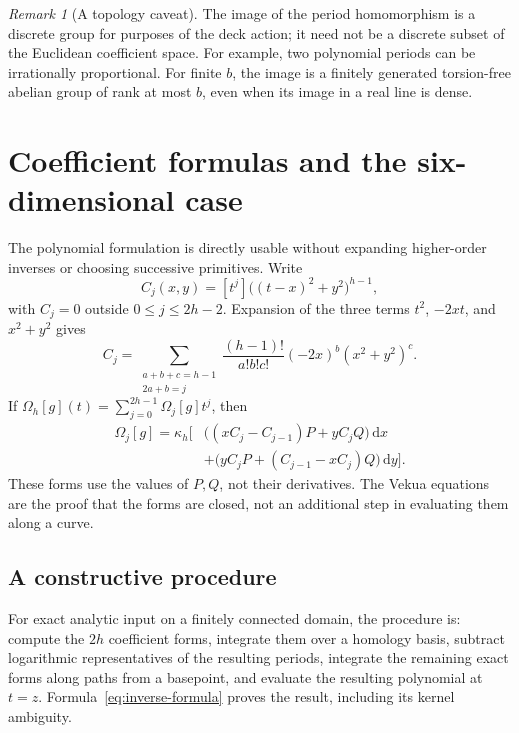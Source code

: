 \documentclass[11pt,a4paper]{article}
\numberwithin{equation}{section}
\theoremstyle{definition}
\theoremstyle{remark}
\newtheorem{remark}[theorem]{Remark}
\newcommand{\Om}{\Omega_h}
\newcommand{\dd}{\,\mathrm d}
\begin{document}
\begin{remark}[A topology caveat]
The image of the period homomorphism is a discrete group for purposes of the
deck action; it need not be a discrete subset of the Euclidean coefficient
space. For example, two polynomial periods can be irrationally proportional.
For finite $b$, the image is a finitely generated torsion-free abelian group
of rank at most $b$, even when its image in a real line is dense.
\end{remark}

\section{Coefficient formulas and the six-dimensional case}
\label{sec:algorithm}

The polynomial formulation is directly usable without expanding higher-order
inverses or choosing successive primitives. Write
\[
 C_j(x,y)=[t^j]\bigl((t-x)^2+y^2\bigr)^{h-1},
\]
with $C_j=0$ outside $0\le j\le2h-2$. Expansion of the three terms
$t^2$, $-2xt$, and $x^2+y^2$ gives
\begin{equation}\label{eq:C-coefficients}
 C_j=\sum_{\substack{a+b+c=h-1\\2a+b=j}}
 \frac{(h-1)!}{a!b!c!}(-2x)^b(x^2+y^2)^c.
\end{equation}
If $\Om[g](t)=\sum_{j=0}^{2h-1}\Omega_j[g]t^j$, then
\begin{equation}\label{eq:coefficient-forms}
\begin{split}
 \Omega_j[g]=\kappa_h\bigl[
 &\bigl((xC_j-C_{j-1})P+yC_jQ\bigr)\dd x\\
 &+\bigl(yC_jP+(C_{j-1}-xC_j)Q\bigr)\dd y\bigr].
\end{split}
\end{equation}
These forms use the values of $P,Q$, not their derivatives. The Vekua equations
are the proof that the forms are closed, not an additional step in evaluating
them along a curve.

\subsection{A constructive procedure}

For exact analytic input on a finitely connected domain, the procedure is:
compute the $2h$ coefficient forms, integrate them over a homology basis,
subtract logarithmic representatives of the resulting periods, integrate the
remaining exact forms along paths from a basepoint, and evaluate the resulting
polynomial at $t=z$. Formula~\eqref{eq:inverse-formula} proves the result,
including its kernel ambiguity.
\end{document}
